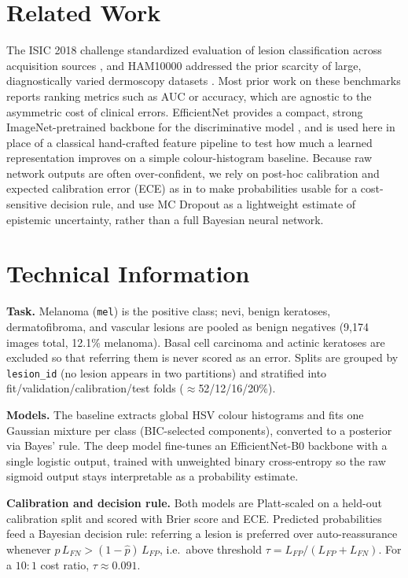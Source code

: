 \documentclass[10pt,a4paper]{article}
\begin{document}
\section{Related Work}
The ISIC 2018 challenge standardized evaluation of lesion classification across acquisition sources \citep{codella2018skin}, and HAM10000 addressed the prior scarcity of large, diagnostically varied dermoscopy datasets \citep{tschandl2018ham10000}. Most prior work on these benchmarks reports ranking metrics such as AUC or accuracy, which are agnostic to the asymmetric cost of clinical errors. EfficientNet provides a compact, strong ImageNet-pretrained backbone for the discriminative model \citep{tan2019efficientnet}, and is used here in place of a classical hand-crafted feature pipeline to test how much a learned representation improves on a simple colour-histogram baseline. Because raw network outputs are often over-confident, we rely on post-hoc calibration and expected calibration error (ECE) as in \citet{guo2017calibration} to make probabilities usable for a cost-sensitive decision rule, and use MC Dropout \citep{gal2016dropout} as a lightweight estimate of epistemic uncertainty, rather than a full Bayesian neural network.

\section{Technical Information}
\textbf{Task.} Melanoma (\texttt{mel}) is the positive class; nevi, benign keratoses, dermatofibroma, and vascular lesions are pooled as benign negatives (9{,}174 images total, 12.1\% melanoma). Basal cell carcinoma and actinic keratoses are excluded so that referring them is never scored as an error. Splits are grouped by \texttt{lesion\_id} (no lesion appears in two partitions) and stratified into fit/validation/calibration/test folds ($\approx$52/12/16/20\%).

\noindent \textbf{Models.} The baseline extracts global HSV colour histograms and fits one Gaussian mixture per class (BIC-selected components), converted to a posterior via Bayes' rule. The deep model fine-tunes an EfficientNet-B0 backbone with a single logistic output, trained with unweighted binary cross-entropy so the raw sigmoid output stays interpretable as a probability estimate.

\noindent \textbf{Calibration and decision rule.} Both models are Platt-scaled on a held-out calibration split and scored with Brier score and ECE. Predicted probabilities feed a Bayesian decision rule: referring a lesion is preferred over auto-reassurance whenever $\hat p\,L_{FN} > (1-\hat p)\,L_{FP}$, i.e.\ above threshold $\tau = L_{FP}/(L_{FP}+L_{FN})$. For a $10{:}1$ cost ratio, $\tau \approx 0.091$.
\end{document}
